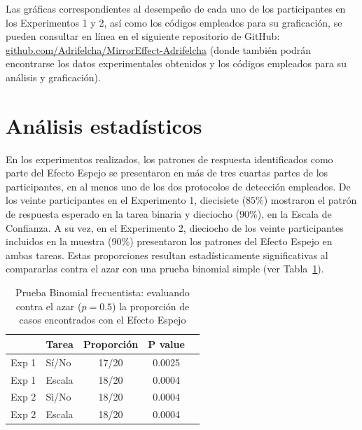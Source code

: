 Las gráficas correspondientes al desempeño de cada uno de los participantes en los Experimentos 1 y 2, así como los códigos empleados para su graficación, se pueden consultar en línea en el siguiente repositorio de GitHub: \href{http://github.com/Adrifelcha/MirrorEffect-Adrifelcha}{github.com/Adrifelcha/MirrorEffect-Adrifelcha} (donde también podrán encontrarse los datos experimentales obtenidos y los códigos empleados para su análisis y graficación).\\




































\section{Análisis estadísticos}

En los experimentos realizados, los patrones de respuesta identificados como parte del Efecto Espejo se presentaron en más de tres cuartas partes de los participantes, en al menos uno de los dos protocolos de detección empleados. De los veinte participantes en el Experimento 1, diecisiete ($85\%$) mostraron el patrón de respuesta esperado en la tarea binaria y dieciocho ($90\%$), en la Escala de Confianza. A su vez, en el Experimento 2, dieciocho de los veinte participantes incluidos en la muestra ($90\%$) presentaron los patrones del Efecto Espejo en ambas tareas. Estas proporciones resultan estadísticamente significativas al compararlas contra el azar con una prueba binomial simple (ver Tabla~\ref{Tabla_Binom}).\\

\begin{table}
\caption[Prueba Binomial frecuentista: evaluando contra el azar la proporción de casos encontrados con el Efecto Espejo]{Prueba Binomial frecuentista: evaluando contra el azar ($p=0.5$) la proporción de casos encontrados con el Efecto Espejo}
\label{Tabla_Binom}
\centering
\begin{tabular}{l l | c c c}
\toprule
\textbf{} & \textbf{Tarea} & \textbf{Proporción} & \textbf{P value}\\
\midrule
Exp 1 & Sí/No & 17/20 & 0.0025 \\
Exp 1 & Escala & 18/20 & 0.0004\\
Exp 2 & Sì/No & 18/20 & 0.0004\\
Exp 2 & Escala & 18/20 & 0.0004\\
\bottomrule
\end{tabular}
\end{table}


